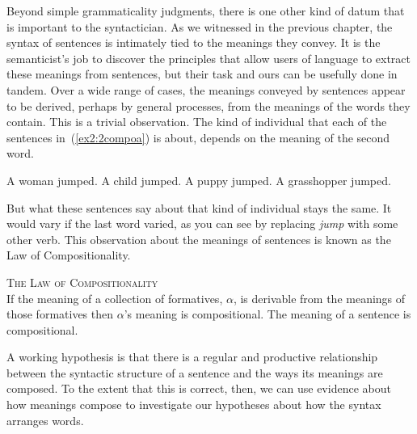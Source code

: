 Beyond simple grammaticality judgments, there is one other kind of datum that is important to the syntactician. As we witnessed in the previous chapter, the syntax of sentences is intimately tied to the meanings they convey. It is the semanticist's job to discover the principles that allow users of language to extract these meanings from sentences, but their task and ours can be usefully done in tandem. Over a wide range of cases, the meanings conveyed by sentences appear to be derived, perhaps by general processes, from the meanings of the words they contain. This is a trivial observation. The kind of individual that each of the sentences in~(\ref{ex2:2compoa}) is about, depends on the meaning of the second word.
\begin{exe}
	\ex \label{ex2:2compoa} 
	\begin{xlist}
		\ex A woman jumped.
		\ex A child jumped.
		\ex A puppy jumped.
		\ex A grasshopper jumped.
	\end{xlist}
\end{exe}
But what these sentences say about that kind of individual stays the same. It would vary if the last word varied, as you can see by replacing \emph{jump} with some other verb. This observation about the meanings of sentences is known as the Law of Compositionality.
\begin{exe}
\ex \label{ex2:1comp} \textsc{The Law of Compositionality}\\
			If the meaning of a collection of formatives, $\alpha$, is derivable from the meanings of those formatives then $\alpha$'s meaning is compositional. The meaning of a sentence is compositional.
\end{exe}
A working hypothesis is that there is a regular and productive relationship between the syntactic structure of a sentence and the ways its meanings are composed. To the extent that this is correct, then, we can use evidence about how meanings compose to investigate our hypotheses about how the syntax arranges words. 

